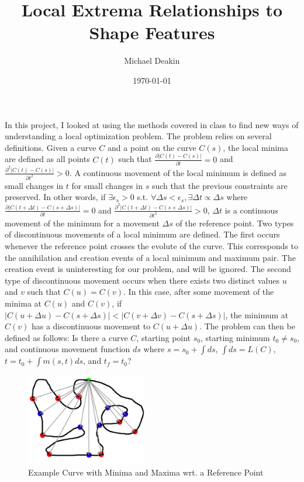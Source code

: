 \documentclass[12pt]{article}
\title{Local Extrema Relationships to Shape Features}
\author{Michael Deakin}
\date{\today}
\begin{document}
\maketitle
In this project, I looked at using the methods covered in class to find new ways of understanding a local optimization problem.
The problem relies on several definitions.
Given a curve $C$ and a point on the curve $C(s)$, the local minima are defined as all points $C(t)$ such that $\frac{\partial|C(t)-C(s)|}{\partial t}=0$ and $\frac{\partial^2|C(t)-C(s)|}{\partial t^2}>0$.
A continuous movement of the local minimum is defined as small changes in $t$ for small changes in $s$ such that the previous constraints are preserved.
In other words, if $\exists \epsilon_s>0$ s.t. $\forall \Delta s<\epsilon_s, \exists \Delta t\propto \Delta s$ where $\frac{\partial|C(t+\Delta t)-C(s + \Delta s)|}{\partial t}=0$ and $\frac{\partial^2|C(t+\Delta t)-C(s+\Delta s)|}{\partial t^2}>0$, $\Delta t$ is a continuous movement of the minimum for a movement $\Delta s$ of the reference point.
Two types of discontinuous movements of a local minimum are defined.
The first occurs whenever the reference point crosses the evolute of the curve.
This corresponds to the annihilation and creation events of a local minimum and maximum pair.
The creation event is uninteresting for our problem, and will be ignored.
The second type of discontinuous movement occurs when there exists two distinct values $u$ and $v$ such that $C(u)=C(v)$.
In this case, after some movement of the minima at $C(u)$ and $C(v)$, if $|C(u+\Delta u)-C(s+\Delta s)|<|C(v+\Delta v)-C(s+\Delta s)|$, the minimum at $C(v)$ has a discontinuous movement to $C(u+\Delta u)$.
The problem can then be defined as follows:
Is there a curve $C$, starting point $s_0$, starting minimum $t_0\neq s_0$, and continuous movement function $ds$ where $s=s_0+\int ds$, $\int ds=L(C)$, $t=t_0+\int m(s, t) ds$, and $t_f=t_0$?\\
\begin{figure}
\centering
\includegraphics[width=200px]{project_problem.png}
\caption{Example Curve with Minima and Maxima wrt. a Reference Point}
\end{figure}
\end{document}
